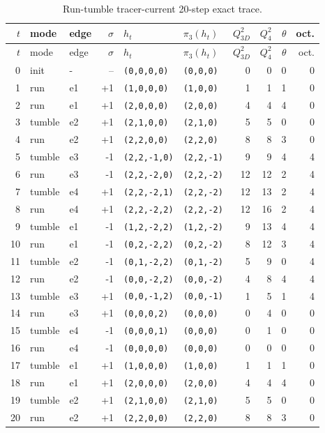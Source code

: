 \scriptsize
\begin{longtable}{@{}rllrllrrrr@{}}
\caption{Run-tumble tracer-current 20-step exact trace.}\label{tab:run-tumble-tracer-current-20step}\\
\toprule
$t$ & mode & edge & $\sigma$ & $h_t$ & $\pi_3(h_t)$ & $Q^2_{3D}$ & $Q^2_4$ & $\theta$ & oct.\\
\midrule
\endfirsthead
\toprule
$t$ & mode & edge & $\sigma$ & $h_t$ & $\pi_3(h_t)$ & $Q^2_{3D}$ & $Q^2_4$ & $\theta$ & oct.\\
\midrule
\endhead
0 & init & - & -- & \texttt{(0,0,0,0)} & \texttt{(0,0,0)} & 0 & 0 & 0 & 0\\
1 & run & e1 & +1 & \texttt{(1,0,0,0)} & \texttt{(1,0,0)} & 1 & 1 & 1 & 0\\
2 & run & e1 & +1 & \texttt{(2,0,0,0)} & \texttt{(2,0,0)} & 4 & 4 & 4 & 0\\
3 & tumble & e2 & +1 & \texttt{(2,1,0,0)} & \texttt{(2,1,0)} & 5 & 5 & 0 & 0\\
4 & run & e2 & +1 & \texttt{(2,2,0,0)} & \texttt{(2,2,0)} & 8 & 8 & 3 & 0\\
5 & tumble & e3 & -1 & \texttt{(2,2,-1,0)} & \texttt{(2,2,-1)} & 9 & 9 & 4 & 4\\
6 & run & e3 & -1 & \texttt{(2,2,-2,0)} & \texttt{(2,2,-2)} & 12 & 12 & 2 & 4\\
7 & tumble & e4 & +1 & \texttt{(2,2,-2,1)} & \texttt{(2,2,-2)} & 12 & 13 & 2 & 4\\
8 & run & e4 & +1 & \texttt{(2,2,-2,2)} & \texttt{(2,2,-2)} & 12 & 16 & 2 & 4\\
9 & tumble & e1 & -1 & \texttt{(1,2,-2,2)} & \texttt{(1,2,-2)} & 9 & 13 & 4 & 4\\
10 & run & e1 & -1 & \texttt{(0,2,-2,2)} & \texttt{(0,2,-2)} & 8 & 12 & 3 & 4\\
11 & tumble & e2 & -1 & \texttt{(0,1,-2,2)} & \texttt{(0,1,-2)} & 5 & 9 & 0 & 4\\
12 & run & e2 & -1 & \texttt{(0,0,-2,2)} & \texttt{(0,0,-2)} & 4 & 8 & 4 & 4\\
13 & tumble & e3 & +1 & \texttt{(0,0,-1,2)} & \texttt{(0,0,-1)} & 1 & 5 & 1 & 4\\
14 & run & e3 & +1 & \texttt{(0,0,0,2)} & \texttt{(0,0,0)} & 0 & 4 & 0 & 0\\
15 & tumble & e4 & -1 & \texttt{(0,0,0,1)} & \texttt{(0,0,0)} & 0 & 1 & 0 & 0\\
16 & run & e4 & -1 & \texttt{(0,0,0,0)} & \texttt{(0,0,0)} & 0 & 0 & 0 & 0\\
17 & tumble & e1 & +1 & \texttt{(1,0,0,0)} & \texttt{(1,0,0)} & 1 & 1 & 1 & 0\\
18 & run & e1 & +1 & \texttt{(2,0,0,0)} & \texttt{(2,0,0)} & 4 & 4 & 4 & 0\\
19 & tumble & e2 & +1 & \texttt{(2,1,0,0)} & \texttt{(2,1,0)} & 5 & 5 & 0 & 0\\
20 & run & e2 & +1 & \texttt{(2,2,0,0)} & \texttt{(2,2,0)} & 8 & 8 & 3 & 0\\
\bottomrule
\end{longtable}
\normalsize
